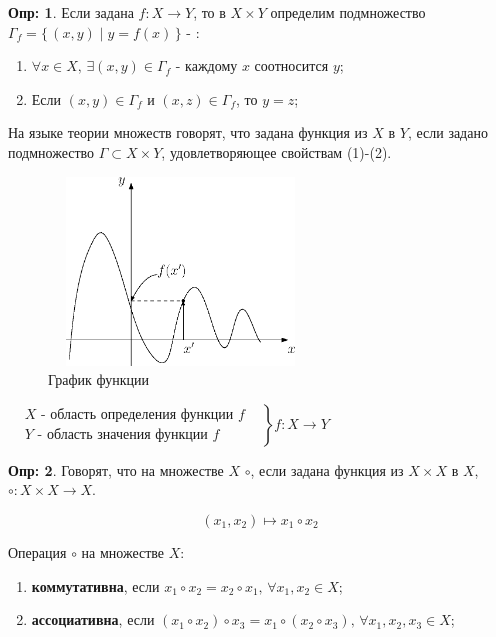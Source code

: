 \documentclass[12pt]{article}
\theoremstyle{definition}
\newtheorem{defn}{Опр:}
\begin{document}
\begin{defn}
	Если задана $f\colon X \rightarrow Y$, то в $X\times Y$ определим подмножество $\Gamma_f = \{\,(x,y) \mid y = f(x)\,\}$ - :
	\begin{enumerate}[label={(\arabic*)}]
		\item $\forall x \in X,\, \exists (x,y) \in \Gamma_f$ - каждому $x$ соотносится $y$;
		\item Если $(x,y) \in \Gamma_f$ и $(x,z) \in \Gamma_f$, то $y = z$;
	\end{enumerate}
\end{defn}

На языке теории множеств говорят, что задана функция из $X$ в $Y$, если задано подмножество $\Gamma \subset X\times Y$, удовлетворяющее свойствам (1)-(2).


\begin{figure}[H]
	\centering
	\includegraphics[width=7cm, height = 5cm]{2_6.eps}
	\caption{График функции}
	\label{fig:2_6}
\end{figure}


$\left.\begin{aligned}
	&	X \text{ - область определения функции }f & \\
	&	Y \text{ - область значения функции }f   &
\end{aligned}
\right\}
f \colon X \rightarrow Y$

\begin{defn}
	Говорят, что на множестве $X$  $\circ$, если задана функция из $X \times X$ в $X$,\\
	 $\circ \colon X \times X \rightarrow X$.
\end{defn}

$$(x_1,x_2) \mapsto x_1 \circ x_2$$


Операция $\circ$ на множестве $X$:
\begin{enumerate}[label={\arabic*)}]
	\item \textbf{коммутативна}, если $x_1 \circ x_2 = x_2 \circ x_1, \, \forall x_1, x_2 \in X$;
	\item \textbf{ассоциативна}, если $(x_1 \circ x_2) \circ x_3 = x_1 \circ (x_2 \circ x_3), \,\forall x_1, x_2, x_3 \in X$;
\end{enumerate}
\end{document}

